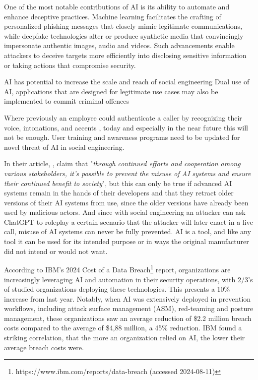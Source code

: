 One of the most notable contributions of AI is its ability to automate and enhance deceptive practices. Machine learning facilitates the crafting of personalized phishing messages that closely mimic legitimate communications, while deepfake technologies alter or produce synthetic media that convincingly impersonate authentic images, audio and videos. Such advancements enable attackers to deceive targets more efficiently into disclosing sensitive information or taking actions that compromise security.

AI has potential to increase the scale and reach of social engineering \citep{king_AI_Crime_Interdisciplinary_Analysis_2019}
Dual use of AI, applications that are designed for legitimate use cases may also be implemented to commit criminal offences \citep{king_AI_Crime_Interdisciplinary_Analysis_2019}

Where previously an employee could authenticate a caller by recognizing their voice, intonations, and accents \citep{mitnick_The_Art_of_Deception_2003}, today and especially in the near future this will not be enough. User training and awareness programs need to be updated for novel threat of AI in social engineering.

In their article, \cite{guptaFromChatGPTtoThreatGPT2023}, claim that "\textit{through continued efforts and cooperation among various stakeholders, it’s possible to prevent the misuse of AI systems and ensure their continued benefit to society}", but this can only be true if advanced AI systems remain in the hands of their developers and that they retract older versions of their AI systems from use, since the older versions have already been used by malicious actors. And since with social engineering an attacker can ask ChatGPT to roleplay a certain scenario that the attacker will later enact in a live call, misuse of AI systems can never be fully prevented. AI is a tool, and like any tool it can be used for its intended purpose or in ways the original manufacturer did not intend or would not want.

According to IBM's 2024 Cost of a Data Breach\footnote{https://www.ibm.com/reports/data-breach (accessed 2024-08-11)} report, organizations are increasingly leveraging AI and automation in their security operations, with 2/3's of studied organizations deploying these technologies. This presents a 10\% increase from last year. Notably, when AI was extensively deployed in prevention workflows, including attack surface management (ASM), red-teaming and posture management, these organizations saw an average reduction of \$2.2 million breach costs compared to the average of \$4,88 million, a 45\% reduction. IBM found a striking correlation, that the more an organization relied on AI, the lower their average breach costs were.

